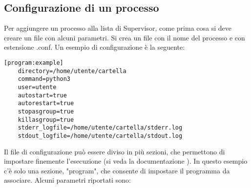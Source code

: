 \subsection{Configurazione di un processo}
\label{subsec:client-supervisor-configurazione}
Per aggiungere un processo alla lista di Supervisor, come prima cosa si deve creare un file con alcuni parametri.
Si crea un file con il nome del processo e con estensione .conf.
Un esempio di configurazione è la seguente:
\begin{lstlisting}[language=text]
	[program:example]
	directory=/home/utente/cartella
	command=python3
	user=utente
	autostart=true
	autorestart=true
	stopasgroup=true
	killasgroup=true
	stderr_logfile=/home/utente/cartella/stderr.log
	stdout_logfile=/home/utente/cartella/stdout.log
\end{lstlisting}
Il file di configurazione può essere diviso in più sezioni, 
che permettono di impostare finemente l'esecuzione (si veda la documentazione \cite{client-supervisor-config}).
In questo esempio c'è solo una sezione, "program", che consente di impostare il programma da associare.
Alcuni parametri riportati sono:
